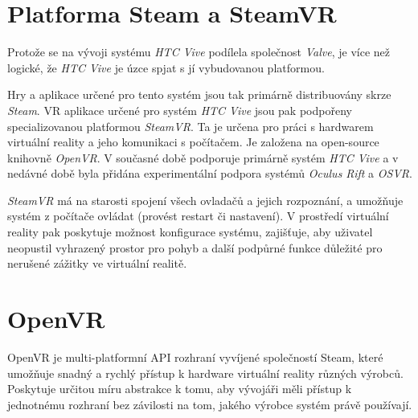 \newpage

\section{Platforma Steam a SteamVR}\label{platforma-steam-a-steamvr}

Protože se na vývoji systému \emph{HTC Vive} podílela společnost
\emph{Valve}, je více než logické, že \emph{HTC Vive} je úzce spjat s
jí vybudovanou platformou.

Hry a aplikace určené pro tento systém jsou tak primárně distribuovány skrze \emph{Steam}. VR aplikace určené pro systém \emph{HTC Vive}
jsou pak podpořeny specializovanou platformou \emph{SteamVR}. Ta je
určena pro práci s hardwarem virtuální reality a jeho komunikaci s
počítačem. Je založena na open-source knihovně \emph{OpenVR}. V současné
době podporuje primárně systém \emph{HTC Vive} a v nedávné době byla
přidána experimentální podpora systémů \emph{Oculus Rift} a \emph{OSVR}. \autocite{steamvrsupports}

\emph{SteamVR} má na starosti spojení všech ovladačů a jejich
rozpoznání, a umožňuje systém z počítače ovládat (provést restart či
nastavení). V prostředí virtuální reality pak poskytuje možnost
konfigurace systému, zajišťuje, aby uživatel neopustil vyhrazený prostor
pro pohyb a další podpůrné funkce důležité pro nerušené zážitky ve
virtuální realitě.

\section{OpenVR}\label{openvr}

OpenVR je multi-platformní API rozhraní vyvíjené společností Steam,
které umožňuje snadný a rychlý přístup k hardware virtuální reality
různých výrobců. Poskytuje určitou míru abstrakce k tomu, aby vývojáři
měli přístup k jednotnému rozhraní bez závilosti na tom, jakého výrobce
systém právě používají.
